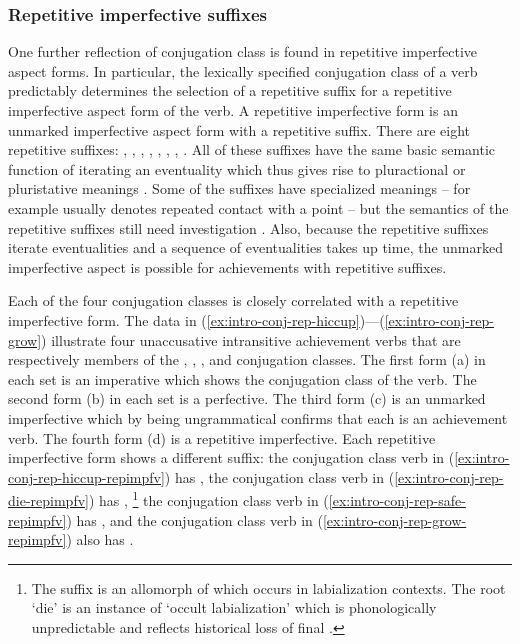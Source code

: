 \documentclass[12pt,letterpaper,oneside,article]{memoir}
\begin{document}
\subsubsection{Repetitive imperfective suffixes}\label{sec:intro-conj-repimp}

One further reflection of conjugation class is found in repetitive imperfective aspect forms.
In particular, the lexically specified conjugation class of a verb predictably determines the selection of a repetitive suffix for a repetitive imperfective aspect form of the verb.
A repetitive imperfective form is an unmarked imperfective aspect form with a repetitive suffix.
There are eight repetitive suffixes: , , , , , , , .
All of these suffixes have the same basic semantic function of iterating an eventuality which thus gives rise to pluractional or pluristative meanings \parencite[527–537]{crippen:2019}.
Some of the suffixes have specialized meanings – for example  usually denotes repeated contact with a point – but the semantics of the repetitive suffixes still need investigation \parencites[cf.][]{henderson:2013a}{mattiola:2020}.
Also, because the repetitive suffixes iterate eventualities and a sequence of eventualities takes up time, the unmarked imperfective aspect is possible for achievements with repetitive suffixes.

Each of the four conjugation classes  is closely correlated with a repetitive imperfective form.
The data in (\ref{ex:intro-conj-rep-hiccup})—(\ref{ex:intro-conj-rep-grow}) illustrate four unaccusative intransitive achievement verbs that are respectively members of the , , , and  conjugation classes.
The first form (a) in each set is an imperative which shows the conjugation class of the verb.
The second form (b) in each set is a perfective.
The third form (c) is an unmarked imperfective which by being ungrammatical confirms that each is an achievement verb.
The fourth form (d) is a repetitive imperfective.
Each repetitive imperfective form shows a different suffix: the  conjugation class verb in (\ref{ex:intro-conj-rep-hiccup-repimpfv}) has , the  conjugation class verb in (\ref{ex:intro-conj-rep-die-repimpfv}) has ,%
\footnote{The suffix  is an allomorph of  which occurs in labialization contexts.
The root  ‘die’ is an instance of ‘occult labialization’ which is phonologically unpredictable and reflects historical loss of final  \parencite[132–134, 849–850]{crippen:2019}.}
the  conjugation class verb in (\ref{ex:intro-conj-rep-safe-repimpfv}) has , and the  conjugation class verb in (\ref{ex:intro-conj-rep-grow-repimpfv}) also has .
\end{document}
